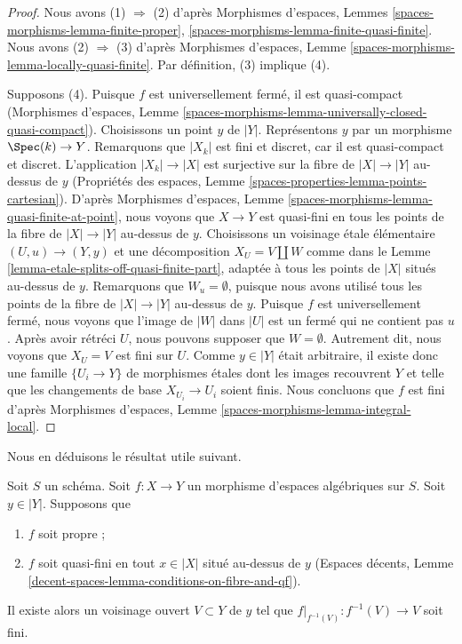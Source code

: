 \begin{proof}
Nous avons (1) $\Rightarrow$ (2) d'après
Morphismes d'espaces, Lemmes \ref{spaces-morphisms-lemma-finite-proper},
\ref{spaces-morphisms-lemma-finite-quasi-finite}.
Nous avons (2) $\Rightarrow$ (3) d'après
Morphismes d'espaces, Lemme
\ref{spaces-morphisms-lemma-locally-quasi-finite}.
Par définition, (3) implique (4).

\medskip\noindent
Supposons (4). Puisque $f$ est universellement fermé, il est quasi-compact
(Morphismes d'espaces, Lemme
\ref{spaces-morphisms-lemma-universally-closed-quasi-compact}).
Choisissons un point $y$ de $|Y|$. Représentons $y$ par un
morphisme $\Spec(k) \to Y$. Remarquons que $|X_k|$ est fini et discret,
car il est quasi-compact et discret. L'application $|X_k| \to |X|$ est surjective
sur la fibre de $|X| \to |Y|$ au-dessus de $y$
(Propriétés des espaces, Lemme \ref{spaces-properties-lemma-points-cartesian}).
D'après
Morphismes d'espaces, Lemme \ref{spaces-morphisms-lemma-quasi-finite-at-point},
nous voyons que $X \to Y$ est quasi-fini en tous les points de la fibre
de $|X| \to |Y|$ au-dessus de $y$.
Choisissons un voisinage étale élémentaire $(U, u) \to (Y, y)$
et une décomposition $X_U = V \amalg W$ comme dans le
Lemme \ref{lemma-etale-splits-off-quasi-finite-part},
adaptée à tous les points de $|X|$ situés au-dessus de $y$.
Remarquons que $W_u = \emptyset$, puisque nous avons utilisé tous les points
de la fibre de $|X| \to |Y|$ au-dessus de $y$.
Puisque $f$ est universellement fermé, nous voyons que
l'image de $|W|$ dans $|U|$ est un fermé qui ne contient pas $u$.
Après avoir rétréci $U$, nous pouvons supposer que $W = \emptyset$.
Autrement dit, nous voyons que $X_U = V$ est fini sur $U$.
Comme $y \in |Y|$ était arbitraire,
il existe donc une famille $\{U_i \to Y\}$
de morphismes étales dont les images recouvrent $Y$ et telle que
les changements de base $X_{U_i} \to U_i$ soient finis.
Nous concluons que $f$ est fini d'après
Morphismes d'espaces, Lemme \ref{spaces-morphisms-lemma-integral-local}.
\end{proof}

\noindent
Nous en déduisons le résultat utile suivant.

\begin{lemma}
\label{lemma-proper-finite-fibre-finite-in-neighbourhood}
Soit $S$ un schéma. Soit $f : X \to Y$ un morphisme d'espaces algébriques
sur $S$. Soit $y \in |Y|$. Supposons que
\begin{enumerate}
\item $f$ soit propre ;
\item $f$ soit quasi-fini en tout $x \in |X|$ situé au-dessus de $y$
(Espaces décents, Lemme \ref{decent-spaces-lemma-conditions-on-fibre-and-qf}).
\end{enumerate}
Il existe alors un voisinage ouvert $V \subset Y$ de $y$
tel que $f|_{f^{-1}(V)} : f^{-1}(V) \to V$ soit fini.
\end{lemma}

